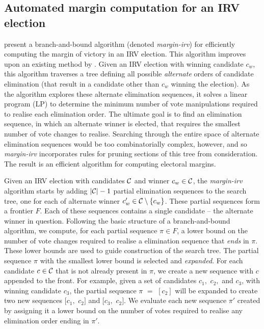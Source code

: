 \documentclass{article}
\newcommand{\pjs}[1]{\marginpar{\sc pjs}{\textcolor{blue}{#1}}}
\begin{document}
\subsection{Automated margin computation for an IRV election}

\citet{blom16} present a branch-and-bound algorithm (denoted \textit{margin-irv}) for efficiently computing the margin of victory in an IRV election. This algorithm improves upon an existing method by \citet{Magrino:irv}.   Given an IRV election with winning candidate $c_w$, this algorithm traverses a tree defining all possible \textit{alternate} orders of candidate elimination (that result in a candidate other than $c_w$ winning the election). As the algorithm explores these alternate elimination sequences, it solves a linear program (LP) to determine the minimum number of vote manipulations required to realise each elimination order. The ultimate goal is to find an elimination sequence, in which an alternate winner is elected, that requires the smallest number of vote changes to realise. Searching through the entire space of alternate elimination sequences would be too combinatorially complex, however, and so \textit{margin-irv} incorporates rules for pruning sections of this tree from consideration. The result is an efficient algorithm for computing electoral margins.

Given an IRV election with candidates $\mathcal{C}$ and winner $c_w \in \mathcal{C}$, the \textit{margin-irv} algorithm starts by adding $|\mathcal{C}| - 1$ partial elimination sequences to the search tree, one for each of alternate winner $c_w' \in \mathcal{C} \setminus \{c_w\}$. These partial sequences form a frontier $F$. Each of these sequences contains a single candidate -- the alternate winner in question. Following the basic structure of a branch-and-bound algorithm, we compute, for each partial sequence $\pi \in F$, a lower bound on the number of vote changes required to realise a elimination sequence that \textit{ends} in $\pi$. These lower bounds are used to guide construction of the search tree. The partial sequence $\pi$ with the smallest lower bound is selected and \textit{expanded}. For each candidate $c \in \mathcal{C}$ that is not already present in $\pi$, we create a new sequence with $c$ appended to the front. For example, given a set of candidates $c_1,$ $c_2,$ and  $c_3$, with winning candidate $c_3$, the partial sequence $\pi$ $=$ $[c_2]$ will be expanded to create two new sequences $[c_1,$ $c_2]$ and $[c_3,$ $c_2]$. We evaluate each new sequence $\pi'$ created by assigning it a lower bound on the number of votes required to realise any elimination order ending in $\pi'$. 
\end{document}
